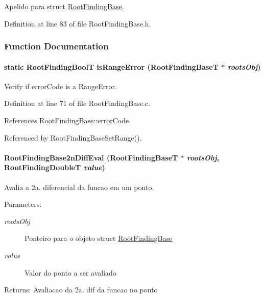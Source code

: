 Apelido para struct \hyperlink{structRootFindingBase}{RootFindingBase}. 



Definition at line 83 of file RootFindingBase.h.

\subsubsection{Function Documentation}
\hypertarget{group____roots_g0a4ce2e4b5aee1fe78afe76b2a2bf71e}{
\paragraph[isRangeError]{\setlength{\rightskip}{0pt plus 5cm}static {\bf RootFindingBoolT} isRangeError ({\bf RootFindingBaseT} $\ast$ {\em rootsObj})}\hfill}
\label{group____roots_g0a4ce2e4b5aee1fe78afe76b2a2bf71e}


Verify if errorCode is a RangeError. 



Definition at line 71 of file RootFindingBase.c.

References RootFindingBase::errorCode.

Referenced by RootFindingBaseSetRange().\hypertarget{group____roots_g328a1c4011dcb869d32a8b566d1c4b67}{
\paragraph[RootFindingBase2nDiffEval]{ RootFindingBase2nDiffEval ({\bf RootFindingBaseT} $\ast$ {\em rootsObj}, \/  {\bf RootFindingDoubleT} {\em value})}\hfill}
\label{group____roots_g328a1c4011dcb869d32a8b566d1c4b67}


Avalia a 2a. diferencial da funcao em um ponto. 

\begin{Desc}
\item[Parameters:]
\begin{description}
\item[{\em rootsObj}]Ponteiro para o objeto struct \hyperlink{structRootFindingBase}{RootFindingBase} \item[{\em value}]Valor do ponto a ser avaliado \end{description}
\end{Desc}
\begin{Desc}
\item[Returns:]Avaliacao da 2a. dif da funcao no ponto \end{Desc}


